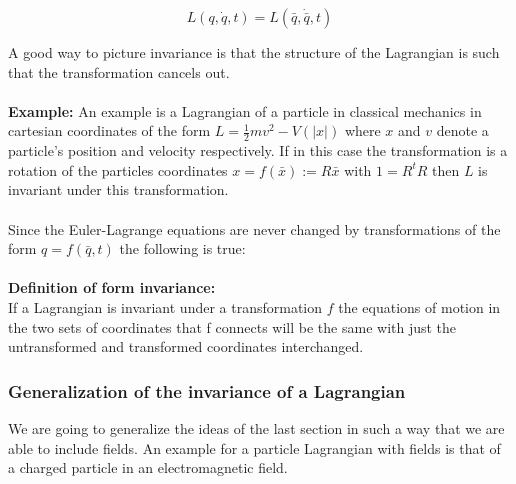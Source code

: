 \documentclass{article}
\begin{document}
\begin{equation} \label{defInvarianceLagrange2}
L(q,\dot{q},t) = L(\bar{q},\dot{\bar{q}},t)
\end{equation}

A good way to picture invariance is that the structure of the Lagrangian is such that the transformation cancels out.
\\ \\
\textbf{Example:}
An example is a Lagrangian of a particle in classical mechanics in cartesian coordinates of the form $L=\frac{1}{2}m v^2 - V(|x|)$ where $x$ and $v$ denote a particle's position and velocity respectively.
If in this case the transformation is a rotation of the particles coordinates $x = f(\bar{x}) := R\bar{x}$ with $1 = R^tR $ then $L$ is invariant under this transformation.
\\ \\
Since the Euler-Lagrange equations are never changed by transformations of the form $q=f(\bar{q},t)$ the following is true:
\\ \\
\hypertarget{hrefDefintionFormInvariance}{\textbf{Definition of form invariance:}} \\
If a Lagrangian is invariant under a transformation $f$ the equations of motion in the two sets of coordinates that f connects will be the same with just the untransformed and transformed coordinates interchanged.

\subsubsection{Generalization of the invariance of a Lagrangian} \label{sectionGeneralizationInvariance}
We are going to generalize the ideas of the last section in such a way that we are able to include fields.
An example for a particle Lagrangian with fields is that of a charged particle in an electromagnetic field.
\end{document}
